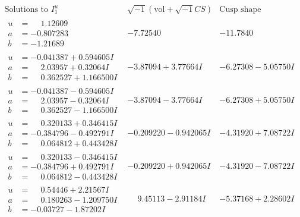 \documentclass[1p]{elsarticle_modified}
\theoremstyle{definition}
\newcommand{\I}{\sqrt{-1}}
\begin{document}
$$\begin{array}{c|c|c}  
\text{Solutions to }I^u_{1}& \I (\text{vol} + \sqrt{-1}CS) & \text{Cusp shape}\\
 \hline 
\begin{aligned}
u &= \phantom{-}1.12609\phantom{ +0.000000I} \\
a &= -0.807283\phantom{ +0.000000I} \\
b &= -1.21689\phantom{ +0.000000I}\end{aligned}
 & -7.72540\phantom{ +0.000000I} & -11.7840\phantom{ +0.000000I} \\ \hline\begin{aligned}
u &= -0.041387 + 0.594605 I \\
a &= \phantom{-}2.03957 + 0.32064 I \\
b &= \phantom{-}0.362527 + 1.166500 I\end{aligned}
 & -3.87094 + 3.77664 I & -6.27308 - 5.05750 I \\ \hline\begin{aligned}
u &= -0.041387 - 0.594605 I \\
a &= \phantom{-}2.03957 - 0.32064 I \\
b &= \phantom{-}0.362527 - 1.166500 I\end{aligned}
 & -3.87094 - 3.77664 I & -6.27308 + 5.05750 I \\ \hline\begin{aligned}
u &= \phantom{-}0.320133 + 0.346415 I \\
a &= -0.384796 - 0.492791 I \\
b &= \phantom{-}0.064812 + 0.443428 I\end{aligned}
 & -0.209220 - 0.942065 I & -4.31920 + 7.08722 I \\ \hline\begin{aligned}
u &= \phantom{-}0.320133 - 0.346415 I \\
a &= -0.384796 + 0.492791 I \\
b &= \phantom{-}0.064812 - 0.443428 I\end{aligned}
 & -0.209220 + 0.942065 I & -4.31920 - 7.08722 I \\ \hline\begin{aligned}
u &= \phantom{-}0.54446 + 2.21567 I \\
a &= \phantom{-}0.180263 - 1.209750 I \\
b &= -0.03727 - 1.87202 I\end{aligned}
 & \phantom{-}9.45113 - 2.91184 I & -5.37168 + 2.28602 I \\ \hline\begin{aligned}

\end{aligned}
\end{array}$$
\end{document}
